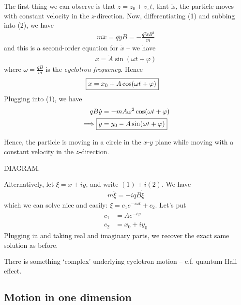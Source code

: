\documentclass{../../template/note}
\begin{document}
    The first thing we can observe is that \(z = z_0 + v_zt\), that is, the particle moves with constant velocity in the \(z\)-direction. Now, differentiating (1) and subbing into (2), we have
    \begin{align*}
        m \dddot{x} = q \ddot{y} B = -\frac{q^2\dot x B^2}{m}
    \end{align*}
    and this is a second-order equation for \(\dot x\) -- we have
    \begin{align*}
        \dot x = \tilde{A} \sin(\omega t + \varphi)
    \end{align*}
    where \(\omega = \frac{qB}{m}\) is the \emph{cyclotron frequency}. Hence
    \begin{align*}
        \Aboxed{x = x_0 + A \cos(\omega t + \varphi)}
    \end{align*}
    Plugging into (1), we have
    \begin{align*}
        qB \dot y &= -mA \omega^2 \cos(\omega t + \varphi) \\
        \implies \Aboxed{y &= y_0 - A \sin(\omega t + \varphi)}
    \end{align*}
    
    Hence, the particle is moving in a circle in the \(x\)-\(y\) plane while moving with a constant velocity in the \(z\)-direction.

    DIAGRAM.

    Alternatively, let \(\xi = x + iy\), and write \((1) + i(2)\). We have
    \begin{align*}
        m \ddot \xi = -iqB \dot \xi
    \end{align*}
    which we can solve nice and easily: \(\xi = c_1 e^{-i\omega t} + c_2\). Let's put
    \begin{align*}
        c_1 &= Ae^{-i\varphi} \\
        c_2 &= x_0 + iy_0
    \end{align*}
    Plugging in and taking real and imaginary parts, we recover the exact same solution as before.

    \begin{remark*}
        There is something `complex' underlying cyclotron motion -- c.f. quantum Hall effect.
    \end{remark*}
    
    \subsection{Motion in one dimension}
\end{document}

